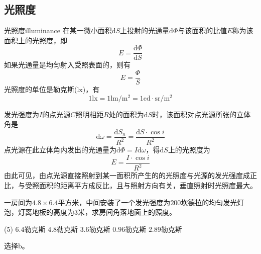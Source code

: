 \documentclass[cn,10pt,chinesefont=founder,math=mtpro2,cite=super,toc=onecol,twoside,openany]{elegantbook}
\begin{document}
\subsection{光照度}
\begin{definition}{光照度}{illuminance}
在某一微小面积$\mathrm{d}S$上投射的光通量$\mathrm{d}\varPhi$与该面积的比值$E$称为该面积上的光照度，即
\begin{equation}
E=\frac{\mathrm{d}\varPhi}{\mathrm{d}S}
\end{equation}
如果光通量是均匀射入受照表面的，则有
\begin{equation}
E=\frac{\varPhi}{S}
\end{equation}
光照度的单位是勒克斯($\mathrm{lx}$)，有
\begin{equation}
1\mathrm{lx}=1\mathrm{lm/m^2}=1\mathrm{cd\cdot sr/m^2}
\end{equation}
\end{definition}
\begin{note}
	发光强度为$I$的点光源$C$照明相距$R$处的面积为$\mathrm{d}S$时，该面积对点光源所张的立体角是
	\begin{equation}
	\mathrm{d}\omega=\frac{\mathrm{d}S_n}{R^2}=\frac{\mathrm{d}S\cdot\cos i}{R^2}
	\end{equation}
	点光源在此立体角内发出的光通量为$\mathrm{d}\varPhi=I\mathrm{d}\omega$，得$\mathrm{d}S$上的光照度为
	\begin{equation}
	E=\frac{I\cdot\cos i}{R^2}
	\end{equation}
	由此可见，由点光源直接照射到某一面积所产生的的光照度与光源的发光强度成正比，与受照面积的距离平方成反比，且与照射方向有关，垂直照射时光照度最大。
\end{note}

\begin{problem}
	一房间为$4.8\times6.4$平方米，中间安装了一个发光强度为$200$坎德拉的均匀发光灯泡，灯离地板的高度为$3$米，求房间角落地面上的照度。  
	\begin{tasks}(5)
		\task $6.4$勒克斯
		\task $4.8$勒克斯
		\task $3.6$勒克斯
		\task $0.96$勒克斯
		\task $2.89$勒克斯
	\end{tasks}
\end{problem}
\begin{solution}
	选择b。
\end{solution}
\end{document}
